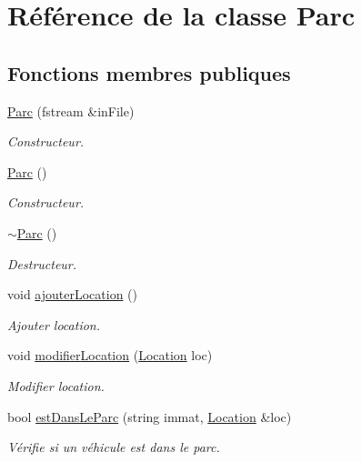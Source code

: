 \hypertarget{class_parc}{
\section{Référence de la classe Parc}
\label{class_parc}
}
\subsection*{Fonctions membres publiques}
\begin{DoxyCompactItemize}
\item 
\hyperlink{class_parc_ac974868bc248cc8ded2ac7c7d536251f}{Parc} (fstream \&inFile)
\begin{DoxyCompactList}\small\item\em Constructeur. \item\end{DoxyCompactList}\item 
\hyperlink{class_parc_ad7545bbf00b69b6bc47d8bc9e6584363}{Parc} ()
\begin{DoxyCompactList}\small\item\em Constructeur. \item\end{DoxyCompactList}\item 
\hyperlink{class_parc_a45de4ddcf862a8ad3da902bc63e0c1f6}{$\sim$Parc} ()
\begin{DoxyCompactList}\small\item\em Destructeur. \item\end{DoxyCompactList}\item 
void \hyperlink{class_parc_ad180ce771871b8f8790bf4703800d8b2}{ajouterLocation} ()
\begin{DoxyCompactList}\small\item\em Ajouter location. \item\end{DoxyCompactList}\item 
void \hyperlink{class_parc_a4ce1969e29ebff5c149c7050e358e880}{modifierLocation} (\hyperlink{class_location}{Location} loc)
\begin{DoxyCompactList}\small\item\em Modifier location. \item\end{DoxyCompactList}\item 
bool \hyperlink{class_parc_a0f8b465d0d57410882787d5bad933a38}{estDansLeParc} (string immat, \hyperlink{class_location}{Location} \&loc)
\begin{DoxyCompactList}\small\item\em Vérifie si un véhicule est dans le parc. \item\end{DoxyCompactList}\item 

\end{DoxyCompactItemize}
